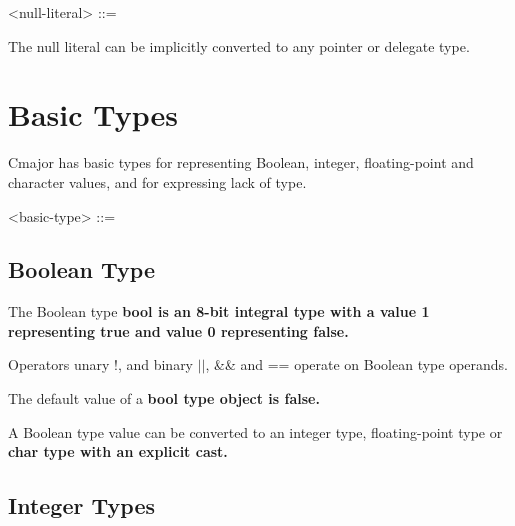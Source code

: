 \documentclass[a4paper,oneside,11pt]{article}
\begin{document}
\begin{grammar}
\label{null-literal}<null-literal> ::= 
\end{grammar}

The null literal can be implicitly converted to any pointer or delegate type.

\section{Basic Types}\label{sec:basictypes}

Cmajor has basic types for representing Boolean, integer, floating-point and character values,
and for expressing lack of type.

\begin{grammar}
\label{basic-type}<basic-type> ::= 
\alt {}
\alt {}
\alt {}
\alt {}
\alt {}
\alt {}
\alt {}
\alt {}
\alt {}
\alt {}
\alt {}
\alt {}
\end{grammar}

\subsection{Boolean Type}

The Boolean type \bf{bool} is an 8-bit integral type with a value 1 representing \bf{true} and value 0 representing \bf{false}.

Operators unary !, and binary $||$, \&\& and == operate on Boolean type operands.

The default value of a \bf{bool} type object is \bf{false}.

A Boolean type value can be converted to an integer type, floating-point type or \bf{char} type with an explicit \bf{cast}.

\subsection{Integer Types}
\end{document}
